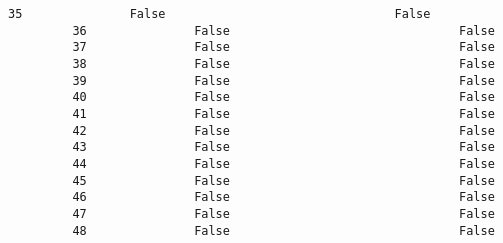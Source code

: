 \documentclass[11pt]{article}
\begin{document}
\begin{Verbatim}[commandchars=\\\{\}]
         35               False                                False   
         36               False                                False   
         37               False                                False   
         38               False                                False   
         39               False                                False   
         40               False                                False   
         41               False                                False   
         42               False                                False   
         43               False                                False   
         44               False                                False   
         45               False                                False   
         46               False                                False   
         47               False                                False   
         48               False                                False   
         

\end{Verbatim}
\end{document}
